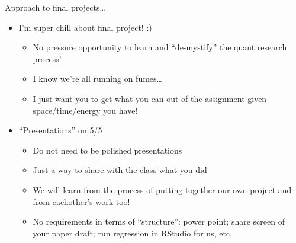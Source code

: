 \documentclass[
  8pt,
  ignorenonframetext,
  dvipsnames]{beamer}
\providecommand{\tightlist}{%
  \setlength{\itemsep}{0pt}\setlength{\parskip}{0pt}}
\let\olditem\item
\renewcommand{\item}{%
  \olditem\vspace{4pt}
}
\begin{document}
\begin{frame}{Approach to final projects\ldots{}}
\protect\hypertarget{approach-to-final-projects}{}

\begin{itemize}
\tightlist
\item
  I'm super chill about final project! :)

  \begin{itemize}
  \tightlist
  \item
    No pressure opportunity to learn and ``de-mystify'' the quant
    research process!
  \item
    I know we're all running on fumes\ldots{}
  \item
    I just want you to get what you can out of the assignment given
    space/time/energy you have!
  \end{itemize}
\item
  ``Presentations'' on 5/5

  \begin{itemize}
  \tightlist
  \item
    Do not need to be polished presentations
  \item
    Just a way to share with the class what you did
  \item
    We will learn from the process of putting together our own project
    and from eachother's work too!
  \item
    No requirements in terms of ``structure'': power point; share screen
    of your paper draft; run regression in RStudio for us, etc.
  \end{itemize}
\end{itemize}

\end{frame}
\end{document}
